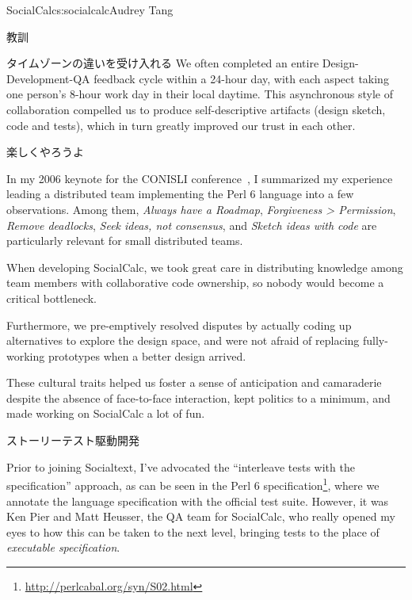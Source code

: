 \begin{aosachapter}{SocialCalc}{s:socialcalc}{Audrey Tang}
\begin{aosasect1}{教訓}
\begin{aosasect2}{タイムゾーンの違いを受け入れる}
We often completed an entire Design-Development-QA feedback cycle
within a 24-hour day, with each aspect taking one person's 8-hour
work day in their local daytime.  This asynchronous style of
collaboration compelled us to produce self-descriptive artifacts
(design sketch, code and tests), which in turn greatly improved our
trust in each other.

\end{aosasect2}

\begin{aosasect2}{楽しくやろうよ}

In my 2006 keynote for the CONISLI conference~\cite{bib:tang:fun}, I
summarized my experience leading a distributed team implementing the
Perl 6 language into a few observations.  Among them, \emph{Always
 have a Roadmap}, \emph{Forgiveness {\textgreater} Permission},
\emph{Remove deadlocks}, \emph{Seek ideas, not consensus}, and
\emph{Sketch ideas with code} are particularly relevant for small
distributed teams.

When developing SocialCalc, we took great care in distributing
knowledge among team members with collaborative code ownership, so
nobody would become a critical bottleneck.

Furthermore, we pre-emptively resolved disputes by actually coding up
alternatives to explore the design space, and were not afraid of
replacing fully-working prototypes when a better design arrived.

These cultural traits helped us foster a sense of anticipation and
camaraderie despite the absence of face-to-face interaction, kept
politics to a minimum, and made working on SocialCalc a lot of fun.

\end{aosasect2}

\begin{aosasect2}{ストーリーテスト駆動開発}

Prior to joining Socialtext, I've advocated the ``interleave tests
with the specification'' approach, as can be seen in the Perl 6
specification\footnote{\url{http://perlcabal.org/syn/S02.html}}, where
we annotate the language specification with the official test suite.
However, it was Ken Pier and Matt Heusser, the QA team for SocialCalc,
who really opened my eyes to how this can be taken to the next level,
bringing tests to the place of \emph{executable specification}.


\end{aosasect2}
\end{aosasect1}
\end{aosachapter}
